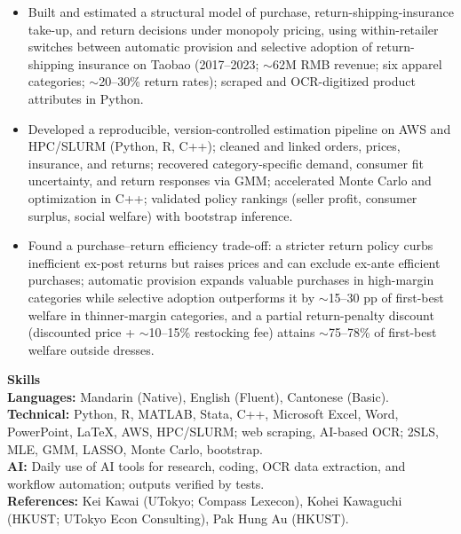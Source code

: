\documentclass[11pt,letterpaper]{article}
\begin{document}
\begin{itemize}
  \item Built and estimated a structural model of purchase, return-shipping-insurance take-up, and return decisions under monopoly pricing, using within-retailer switches between automatic provision and selective adoption of return-shipping insurance on Taobao (2017--2023; \(\sim\)62M RMB revenue; six apparel categories; \(\sim\)20--30\% return rates); scraped and OCR-digitized product attributes in Python.
  \item Developed a reproducible, version-controlled estimation pipeline on AWS and HPC/SLURM (Python, R, C++); cleaned and linked orders, prices, insurance, and returns; recovered category-specific demand, consumer fit uncertainty, and return responses via GMM; accelerated Monte Carlo and optimization in C++; validated policy rankings (seller profit, consumer surplus, social welfare) with bootstrap inference.
  \item Found a purchase--return efficiency trade-off: a stricter return policy curbs inefficient ex-post returns but raises prices and can exclude ex-ante efficient purchases; automatic provision expands valuable purchases in high-margin categories while selective adoption outperforms it by \(\sim\)15--30 pp of first-best welfare in thinner-margin categories, and a partial return-penalty discount (discounted price + \(\sim\)10--15\% restocking fee) attains \(\sim\)75--78\% of first-best welfare outside dresses.
\end{itemize}

\vspace{0.15pt}

{\large \textbf{Skills}}\\[-0.5pt]
\textbf{Languages:} Mandarin (Native), English (Fluent), Cantonese (Basic).\\
\textbf{Technical:} Python, R, MATLAB, Stata, C++, Microsoft Excel, Word, PowerPoint, \LaTeX, AWS, HPC/SLURM; web scraping, AI-based OCR; 2SLS, MLE, GMM, LASSO, Monte Carlo, bootstrap.\\
\textbf{AI:} Daily use of AI tools for research, coding, OCR data extraction, and workflow automation; outputs verified by tests.\\
\textbf{References:} Kei Kawai (UTokyo; Compass Lexecon), Kohei Kawaguchi (HKUST; UTokyo Econ Consulting), Pak Hung Au (HKUST).
\end{document}
